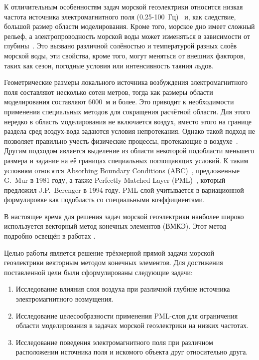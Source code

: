 \documentclass[a4paper,14pt]{article}
\begin{document}
К отличительным особенностям задач морской геоэлектрики относится низкая частота источника электромагнитного поля (0.25-100~Гц)~\citep{gabrielsen} и, как следствие, большой размер области моделирования. Кроме того, морское дно имеет сложный рельеф, а электропроводность морской воды может изменяться в зависимости от глубины~\citep{shurina}. Это вызвано различной солёностью и температурой разных слоёв морской воды, эти свойства, кроме того, могут меняться от внешних факторов, таких как сезон, погодные условия или интенсивность таяния льдов.

Геометрические размеры локального источника возбуждения электромагнитного поля составляют несколько сотен метров, тогда как размеры области моделирования составляют 6000~м и более. Это приводит к необходимости применения специальных методов для сокращения расчётной области. Для этого нередко в область моделирования не включается воздух, вместо этого на границе раздела сред воздух-вода задаются условия непротекания. Однако такой подход не позволяет правильно учесть физические процессы, протекающие в воздухе~\citep{anderson, conf_nti_2015}. Другим подходом является выделение из области некоторой подобласти меньшего размера и задание на её границах специальных поглощающих условий. К таким условиям относятся Absorbing Boundary Conditions (ABC)~\citep{mur}, предложенные G.~Mur в 1981 году, а также Perfectly Matched Layer (PML)~\citep{berenger, wiik_dehoop_ursin}, который предложил J.P.~Berenger в 1994 году. PML-слой учитывается в вариационной формулировке как подобласть со специальными коэффициентами.

В настоящее время для решения задач морской геоэлектрики наиболее широко используется векторный метод конечных элементов (ВМКЭ). Этот метод подробно освещён в работах \citep{balandin_vfem, monk}.

Целью работы является решение трёхмерной прямой задачи морской геоэлектрики векторным методом конечных элементов. Для достижения поставленной цели были сформулированы следующие задачи:
\begin{enumerate}
	\item Исследование влияния слоя воздуха при различной глубине источника электромагнитного возмущения.
	\item Исследование целесообразности применения PML-слоя для ограничения области моделирования в задачах морской геоэлектрики на низких частотах.
	\item Исследование поведения электромагнитного поля при различном расположении источника поля и искомого объекта друг относительно друга.
\end{enumerate}
\end{document}
